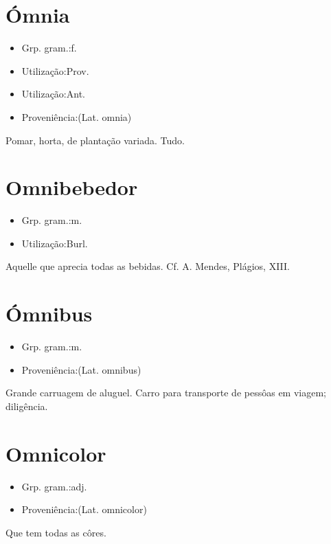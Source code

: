 \section{Ómnia}
\begin{itemize}
\item {Grp. gram.:f.}
\end{itemize}
\begin{itemize}
\item {Utilização:Prov.}
\end{itemize}
\begin{itemize}
\item {Utilização:Ant.}
\end{itemize}
\begin{itemize}
\item {Proveniência:(Lat. \textunderscore omnia\textunderscore )}
\end{itemize}
Pomar, horta, de plantação variada.
Tudo.
\section{Omnibebedor}
\begin{itemize}
\item {Grp. gram.:m.}
\end{itemize}
\begin{itemize}
\item {Utilização:Burl.}
\end{itemize}
Aquelle que aprecia todas as bebidas. Cf. A. Mendes, \textunderscore Plágios\textunderscore , XIII.
\section{Ómnibus}
\begin{itemize}
\item {Grp. gram.:m.}
\end{itemize}
\begin{itemize}
\item {Proveniência:(Lat. \textunderscore omnibus\textunderscore )}
\end{itemize}
Grande carruagem de aluguel.
Carro para transporte de pessôas em viagem; diligência.
\section{Omnicolor}
\begin{itemize}
\item {Grp. gram.:adj.}
\end{itemize}
\begin{itemize}
\item {Proveniência:(Lat. \textunderscore omnicolor\textunderscore )}
\end{itemize}
Que tem todas as côres.
